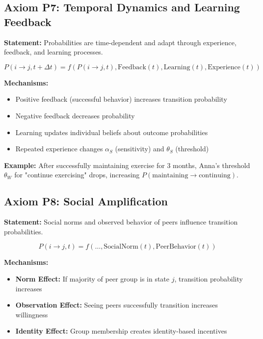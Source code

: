 \documentclass[11pt, a4paper]{article}
\begin{document}
\subsection{Axiom P7: Temporal Dynamics and Learning Feedback}

\textbf{Statement:} Probabilities are time-dependent and adapt through experience, feedback, and learning processes.

\begin{equation}
P(i \to j, t+\Delta t) = f(P(i \to j, t), \text{Feedback}(t), \text{Learning}(t), \text{Experience}(t))
\end{equation}

\textbf{Mechanisms:}
\begin{itemize}[nosep]
    \item Positive feedback (successful behavior) increases transition probability
    \item Negative feedback decreases probability
    \item Learning updates individual beliefs about outcome probabilities
    \item Repeated experience changes $\alpha_S$ (sensitivity) and $\theta_S$ (threshold)
\end{itemize}

\textbf{Example:} After successfully maintaining exercise for 3 months, Anna's threshold $\theta_W$ for "continue exercising" drops, increasing $P(\text{maintaining} \to \text{continuing})$.

\subsection{Axiom P8: Social Amplification}

\textbf{Statement:} Social norms and observed behavior of peers influence transition probabilities.

\begin{equation}
P(i \to j, t) = f(\ldots, \text{SocialNorm}(t), \text{PeerBehavior}(t))
\end{equation}

\textbf{Mechanisms:}
\begin{itemize}[nosep]
    \item \textbf{Norm Effect:} If majority of peer group is in state $j$, transition probability increases
    \item \textbf{Observation Effect:} Seeing peers successfully transition increases willingness
    \item \textbf{Identity Effect:} Group membership creates identity-based incentives
\end{itemize}
\end{document}
